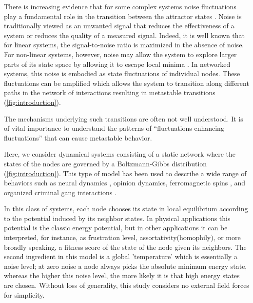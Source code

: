 \documentclass[a4paper, 11pt, twocolumn]{article}
\begin{document}
There is  increasing evidence that for  some complex systems
noise fluctuations play a fundamental role in the transition
between            the           attractor            states
\cite{Beggs2012,Mitchell1993,Mitchella,Forgoston2018a}.  Noise
is traditionally  viewed as an unwanted  signal that reduces
the effectiveness  of a system  or reduces the quality  of a
measured signal.  Indeed, it is  well known that  for linear
systems,  the signal-to-noise ratio  is  maximized in  the
absence of noise. For non-linear systems, however, noise may
allow the system to explore  larger parts of its state space
by     allowing     it     to    escape     local     minima
\cite{Czaplicka2013,Nicolis2016}.  In networked  systems, this
noise is embodied as state fluctuations of individual nodes.
These fluctuations can be  amplified which allows the system
to  transition  along  different  paths in  the  network  of
interactions    resulting    in    metastable    transitions
(\cref{fig:introduction}).

The  mechanisms underlying  such transitions  are often  not
well understood. It is of vital importance to understand the
patterns of  ``fluctuations enhancing fluctuations''  that can
cause metastable behavior.

Here, we  consider dynamical systems consisting  of a static
network  where the  states of  the nodes  are governed  by a
Boltzmann-Gibbs distribution (\cref{fig:introduction}). This
type of  model has  been used  to describe  a wide  range of
behaviors  such   as  neural   dynamics  \cite{Hopfield1982b},
opinion dynamics, ferromagnetic spins \cite{Glauber1963}, and
organized criminal gang interactions \cite{DOrsogna2015a}.

In this  class of  systems, each node  chooses its  state in
local equilibrium according to  the potential induced by its
neighbor states. In physical  applications this potential is
the classic  energy potential, but in  other applications it
can  be interpreted,  for  instance,  as frustration  level,
assortativity(homophily),  or   more  broadly   speaking,  a
fitness score of the state  of the node given its neighbors.
The   second  ingredient   in   this  model   is  a   global
'temperature' which  is essentially  a noise level;  at zero
noise a node always picks the absolute minimum energy state,
whereas the higher  this noise level, the more  likely it is
that  high  energy  states   are  chosen.  Without  loss  of
generality, this  study considers  no external  field forces
for simplicity.
\end{document}
